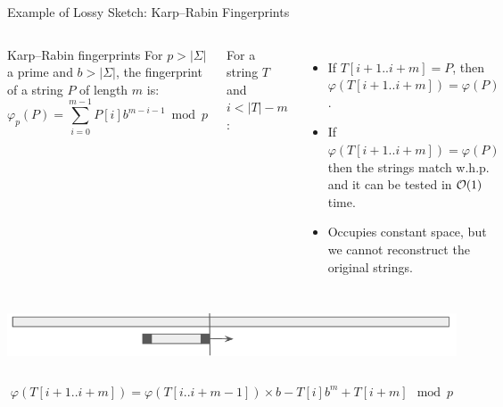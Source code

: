 \begin{frame}{Example of Lossy Sketch: Karp--Rabin Fingerprints}
    \begin{columns}
        \begin{mydefblock}{Karp--Rabin fingerprints}
            For $p>|\Sigma|$ a prime and $b > |\Sigma|$,
            the fingerprint of a string $P$ of length $m$ is:
            $$\varphi_{p}(P) = \sum_{i = 0}^{m-1}  P[i]b^{m-i-1} \bmod p$$
        \end{mydefblock}
        \pause
        
        For a string $T$ and $i < |T|-m$:\\
        \begin{itemize}
            \item If $T[i+1..i+m]=P$, then $\varphi(T[i+1..i+m])=\varphi(P)$.\pause
            \item If $\varphi(T[i+1..i+m])=\varphi(P)$ then the strings match w.h.p. and it can be tested in $\mathcal{O}(1)$ time.\pause
            \item Occupies constant space, but we cannot reconstruct the original strings.\pause
        \end{itemize}
    \end{columns}

    \bigskip
    \begin{columns}
    \includegraphics[width=\textwidth]{pictures/slidding_window.png}
    \end{columns}\pause
    $$ \varphi(T[i+1..i+m]) = \varphi(T[i..i+m-1])\times b - T[i]b^m + T[i+m] \mod p$$\vspace{-0.5cm}
\end{frame}

